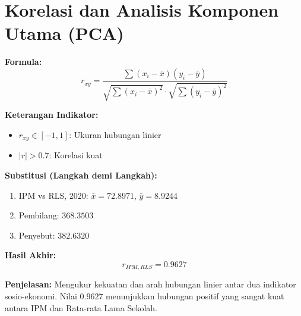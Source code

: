\documentclass[11pt,a4paper]{article}
\begin{document}
\section{Korelasi dan Analisis Komponen Utama (PCA)}
\begin{tcolorbox}[formula_box, title={Korelasi Pearson ($r_{xy}$)}]
\textbf{Formula:}
\[ r_{xy} = \frac{\sum(x_i-\bar{x})(y_i-\bar{y})}{\sqrt{\sum(x_i-\bar{x})^2}\cdot\sqrt{\sum(y_i-\bar{y})^2}} \]

\textbf{Keterangan Indikator:}
\begin{itemize}
  \item $r_{xy}\in[-1,1]$: Ukuran hubungan linier
  \item $|r|>0.7$: Korelasi kuat
\end{itemize}

\textbf{Substitusi (Langkah demi Langkah):}
\begin{enumerate}
  \item IPM vs RLS, 2020: $\bar{x}=72.8971$, $\bar{y}=8.9244$
  \item Pembilang: $368.3503$
  \item Penyebut: $382.6320$
\end{enumerate}

\textbf{Hasil Akhir:}
\[ r_{IPM,RLS} = 0.9627 \]

\textbf{Penjelasan:} Mengukur kekuatan dan arah hubungan linier antar dua indikator sosio-ekonomi. Nilai $0.9627$ menunjukkan hubungan positif yang sangat kuat antara IPM dan Rata-rata Lama Sekolah.
\end{tcolorbox}
\end{document}
